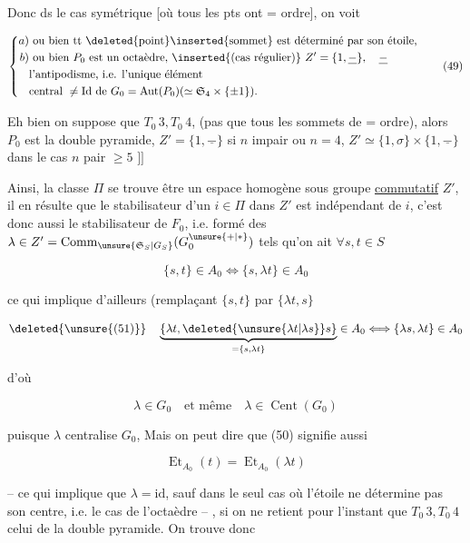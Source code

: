 Donc ds le cas symétrique [où tous les pts ont = ordre], on voit

\[
\left\{\begin{aligned}
a)&\ \text{ou bien tt \deleted{point}\inserted{sommet} est déterminé par son étoile,}\\
b)&\ \text{ou bien }P_0\text{ est un octaèdre, }\inserted{\text{(cas régulier)}}\
 Z'=\{1,\underline-\},\quad\underline-\\
 &\text{l'antipodisme, i.e. l'unique élément}\\
 &\text{central }\ne\mathrm{Id}\text{ de }G_0=\operatorname{Aut}(P_0)
 (\simeq\mathfrak S_4\times\{\pm1\}).
\end{aligned}\right.
\tag*{$(49)$}
\]

Eh bien on suppose  que $T_0\,3,T_0\,4$, (pas que tous les sommets de = ordre), alors $P_0$ est la double pyramide, $Z'=\{1,\underline-\}$ si $n$ impair ou $n=4$, $Z'\simeq\{1,\sigma\}\times\{1,\underline-\}$ dans le cas $n$ pair $\geqslant5$ $]\!]$

Ainsi, la classe $\Pi$  se trouve être un espace homogène sous  groupe \uline{commutatif} $Z'$, il en résulte que le stabilisateur d'un $i\in\Pi$ dans $Z'$ est indépendant de $i$, c'est donc aussi le stabilisateur de $F_0$,  i.e. formé des $\lambda\in Z'=\operatorname{Comm}_{\unsure{\mathfrak S_S|G_S}}(G_0^{\unsure{+|\ast}})$ tels qu'on ait $\forall s,t\in S$

\[
\{s,t\}\in A_0\Longleftrightarrow\{s,\lambda t\}\in A_0
\tag*{$(50)$}
\]

ce qui implique d'ailleurs (remplaçant $\{s,t\}$ par $\{\lambda t,s\}$

\[
\deleted{\unsure{(51)}}\quad
\underbrace{\{\lambda t,\deleted{\unsure{\lambda t|\lambda s}}s\}}_{=\{s,\lambda t\}}\in A_0
\Longleftrightarrow\{\lambda s,\lambda t\}\in A_0
\]

d'où

\[
\lambda\in G_0\quad\text{et même}\quad \lambda\in\operatorname{Cent}(G_0)
\]

puisque $\lambda$ centralise $G_0$,  Mais  on peut dire que (50) signifie aussi

\[
\operatorname{Et}_{A_0}(t)=\operatorname{Et}_{A_0}(\lambda t)
\tag*{$(51)$}
\]

-- ce qui implique que $\lambda=\mathrm{id}$, sauf dans le seul cas où  l'étoile ne détermine pas son centre, i.e. le cas  de l'octaèdre -- , si on ne retient pour l'instant que $T_0\,3,T_0\,4$ celui de la double pyramide. On trouve donc

